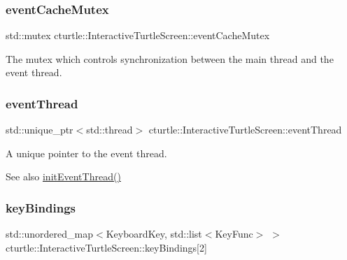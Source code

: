 \subsubsection{\texorpdfstring{event\+Cache\+Mutex}{eventCacheMutex}}
{\footnotesize\ttfamily std\+::mutex cturtle\+::\+Interactive\+Turtle\+Screen\+::event\+Cache\+Mutex\hspace{0.3cm}{\ttfamily [protected]}}

The mutex which controls synchronization between the main thread and the event thread. \mbox{\label{classcturtle_1_1InteractiveTurtleScreen_ace652d27f7e65ee15cd4dab7074874d2}} 
\subsubsection{\texorpdfstring{event\+Thread}{eventThread}}
{\footnotesize\ttfamily std\+::unique\+\_\+ptr$<$std\+::thread$>$ cturtle\+::\+Interactive\+Turtle\+Screen\+::event\+Thread\hspace{0.3cm}{\ttfamily [protected]}}

A unique pointer to the event thread. \begin{DoxySeeAlso}{See also}
\hyperlink{classcturtle_1_1InteractiveTurtleScreen_aa7c436f89d052e42500356ee5f479776}{init\+Event\+Thread()} 
\end{DoxySeeAlso}
\mbox{\label{classcturtle_1_1InteractiveTurtleScreen_a97436519878c0a69c1b6215934fa2607}} 
\subsubsection{\texorpdfstring{key\+Bindings}{keyBindings}}
{\footnotesize\ttfamily std\+::unordered\+\_\+map$<$Keyboard\+Key, std\+::list$<$Key\+Func$>$ $>$ cturtle\+::\+Interactive\+Turtle\+Screen\+::key\+Bindings\mbox{[}2\mbox{]}\hspace{0.3cm}{\ttfamily [protected]}}

